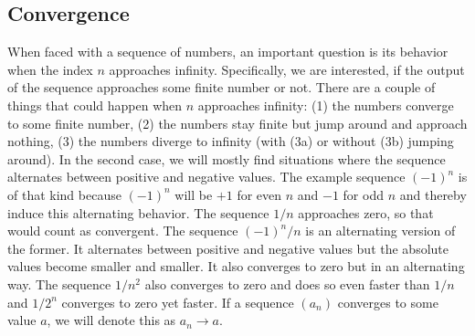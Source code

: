 \subsection{Convergence}
When faced with a sequence of numbers, an important question is its behavior when the index $n$ approaches infinity. Specifically, we are interested, if the output of the sequence approaches some finite number or not. There are a couple of things that could happen when $n$ approaches infinity: (1) the numbers converge to some finite number, (2) the numbers stay finite but jump around and approach nothing, (3) the numbers diverge to infinity (with (3a) or without (3b) jumping around). In the second case, we will mostly find situations where the sequence alternates between positive and negative values. The example sequence $(-1)^n$ is of that kind because $(-1)^n$ will be $+1$ for even $n$ and $-1$ for odd $n$ and thereby induce this alternating behavior. The sequence $1/n$ approaches zero, so that would count as convergent. The sequence $(-1)^n / n$ is an alternating version of the former. It alternates between positive and negative values but the absolute values become smaller and smaller. It also converges to zero but in an alternating way. The sequence $1/n^2$ also converges to zero and does so even faster than $1/n$ and $1/2^n$ converges to zero yet faster. If a sequence $(a_n)$ converges to some value $a$, we will denote this as $a_n \rightarrow a$.







